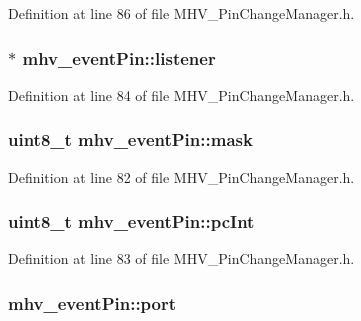 Definition at line 86 of file M\-H\-V\-\_\-\-Pin\-Change\-Manager.\-h.

\hypertarget{structmhv__event_pin_a90fdc2fdc188f1b614a41b45a7f6ba6c}{
\subsubsection[{listener}]{$\ast$ mhv\-\_\-event\-Pin\-::listener}}\label{structmhv__event_pin_a90fdc2fdc188f1b614a41b45a7f6ba6c}


Definition at line 84 of file M\-H\-V\-\_\-\-Pin\-Change\-Manager.\-h.

\hypertarget{structmhv__event_pin_a28a7cf2eb643ead207ce1e1c4dcab533}{
\subsubsection[{mask}]{\setlength{\rightskip}{0pt plus 5cm}uint8\-\_\-t mhv\-\_\-event\-Pin\-::mask}}\label{structmhv__event_pin_a28a7cf2eb643ead207ce1e1c4dcab533}


Definition at line 82 of file M\-H\-V\-\_\-\-Pin\-Change\-Manager.\-h.

\hypertarget{structmhv__event_pin_a94d11da6ceacb80c9c2f30edbe99bd0e}{
\subsubsection[{pc\-Int}]{\setlength{\rightskip}{0pt plus 5cm}uint8\-\_\-t mhv\-\_\-event\-Pin\-::pc\-Int}}\label{structmhv__event_pin_a94d11da6ceacb80c9c2f30edbe99bd0e}


Definition at line 83 of file M\-H\-V\-\_\-\-Pin\-Change\-Manager.\-h.

\hypertarget{structmhv__event_pin_a9ee4dff40bf4ba67a3b177b945a68f48}{
\subsubsection[{port}]{ mhv\-\_\-event\-Pin\-::port}}\label{structmhv__event_pin_a9ee4dff40bf4ba67a3b177b945a68f48}



